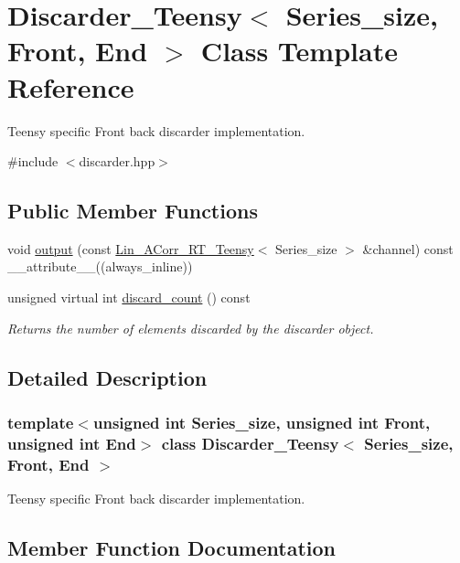 \hypertarget{classDiscarder__Teensy}{}\section{Discarder\+\_\+\+Teensy$<$ Series\+\_\+size, Front, End $>$ Class Template Reference}
\label{classDiscarder__Teensy}


Teensy specific Front back discarder implementation.  




{\ttfamily \#include $<$discarder.\+hpp$>$}

\subsection*{Public Member Functions}
\begin{DoxyCompactItemize}
\item 
void \hyperlink{classDiscarder__Teensy_a50787ecd4fc07a1d1cf2b692af979ac7}{output} (const \hyperlink{classLin__ACorr__RT__Teensy}{Lin\+\_\+\+A\+Corr\+\_\+\+R\+T\+\_\+\+Teensy}$<$ Series\+\_\+size $>$ \&channel) const \+\_\+\+\_\+attribute\+\_\+\+\_\+((always\+\_\+inline))
\item 
unsigned virtual int \hyperlink{classDiscarder__Teensy_a4b4c55953522a2404d7fe5c59bac0068}{discard\+\_\+count} () const
\begin{DoxyCompactList}\small\item\em Returns the number of elements discarded by the discarder object. \end{DoxyCompactList}\end{DoxyCompactItemize}


\subsection{Detailed Description}
\subsubsection*{template$<$unsigned int Series\+\_\+size, unsigned int Front, unsigned int End$>$\newline
class Discarder\+\_\+\+Teensy$<$ Series\+\_\+size, Front, End $>$}

Teensy specific Front back discarder implementation. 

\subsection{Member Function Documentation}
\mbox{\label{classDiscarder__Teensy_a4b4c55953522a2404d7fe5c59bac0068}} 
